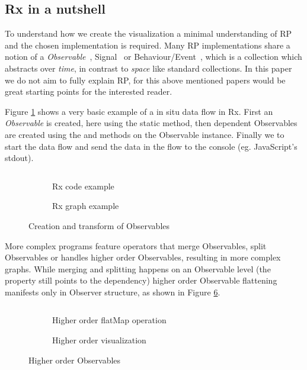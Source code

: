 \subsection{Rx in a nutshell}
To understand how we create the visualization a minimal understanding of RP and the chosen implementation is required. Many RP implementations share a notion of a \textit{Observable}~\cite{meijer2010subject}, Signal~\cite{czaplicki2012elm} or Behaviour/Event~\cite{elliott1997functional},  which is a collection which abstracts over \textit{time}, in contrast to \textit{space} like standard collections. In this paper we do not aim to fully explain RP, for this above mentioned papers would be great starting points for the interested reader.

Figure \ref{sample1} shows a very basic example of a in situ data flow in Rx. First an \textit{Observable} is created, here using the static  method, then dependent Observables are created using the  and  methods on the Observable instance. Finally we  to start the data flow and send the data in the flow to the console (eg. JavaScript's stdout).

\begin{figure}

\begin{subfigure}[a]{\columnwidth}
\inputminted[tabsize=2]{javascript}{listings/sample1.js}	
\caption{Rx code example}
\label{sample1}
\end{subfigure}

\begin{subfigure}[b]{\columnwidth}
\centering

\caption{Rx graph example}
\label{chaincreate}
\end{subfigure}

\caption{Creation and transform of Observables}

\end{figure}

More complex programs feature operators that merge Observables, split Observables or handles higher order Observables, resulting in more complex graphs. While merging and splitting happens on an Observable level (the  property still points to the dependency) higher order Observable flattening manifests only in Observer structure, as shown in Figure \ref{chainhigher}.

\begin{figure}

\begin{subfigure}[a]{\columnwidth}
\inputminted[tabsize=2]{javascript}{listings/sample3.js}	
\caption{Higher order flatMap operation}
\label{sample3}
\end{subfigure}

\begin{subfigure}[b]{\columnwidth}
\centering

\caption{Higher order visualization}
\label{chainhigher}
\end{subfigure}

\caption{Higher order Observables}

\end{figure}

